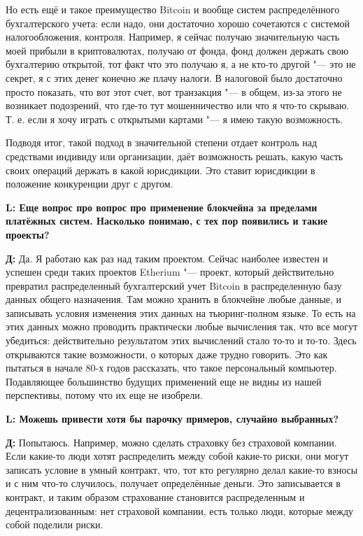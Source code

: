 \documentclass[10pt, a5paper]{article}
\begin{document}
Но есть ещё и такое преимущество Bitcoin и вообще систем распределённого бухгалтерского учета: если надо, они достаточно хорошо сочетаются с системой налогообложения, контроля. Например, я сейчас получаю значительную часть моей прибыли в криптовалютах, получаю от фонда, фонд должен держать свою бухгалтерию открытой, тот факт что это получаю я, а не кто-то другой "--- это не секрет, я с этих денег конечно же плачу налоги. В налоговой было достаточно просто показать, что вот этот счет, вот транзакция "---  в общем, из-за этого не возникает подозрений, что где-то тут мошенничество или что я что-то скрываю. Т. е. если я хочу играть с открытыми картами "--- я имею такую возможность.

Подводя итог,  такой подход в значительной степени отдает контроль над средствами индивиду или организации, даёт возможность решать, какую часть своих операций держать в какой юрисдикции. Это ставит юрисдикции в положение конкуренции друг с другом.


{\noindent \bf L: Еще вопрос про вопрос про применение блокчейна за пределами платёжных систем. Насколько понимаю, с тех пор появились и такие проекты?}

{\noindent \bf Д:} Да. Я работаю как раз над таким проектом. Сейчас наиболее известен и успешен среди таких проектов Etherium "--- проект, который действительно превратил распределенный бухгалтерский учет Bitcoin в распределенную базу данных общего назначения. Там можно хранить в блокчейне любые данные, и записывать условия изменения этих данных на тьюринг-полном языке.
 То есть на этих данных можно проводить практически любые вычисления так, что все могут убедиться: действительно результатом этих вычислений стало то-то и то-то. Здесь открываются такие возможности, о которых даже трудно говорить. Это как пытаться в начале 80-х годов рассказать, что такое персональный компьютер. Подавляющее большинство будущих применений еще не видны из нашей перспективы, потому что их еще не изобрели.

{\noindent \bf L: Можешь привести хотя бы парочку примеров, случайно выбранных?}

{\noindent \bf Д:} Попытаюсь. Например, можно сделать страховку без страховой компании. Если какие-то люди хотят распределить между собой какие-то риски, они могут записать условие в умный контракт, что, тот кто регулярно делал какие-то взносы и с ним что-то случилось, получает определённые деньги. Это записывается в контракт, и таким образом страхование становится распределенным и децентрализованным: нет страховой компании, есть только люди, которые между собой поделили риски. 
\end{document}
